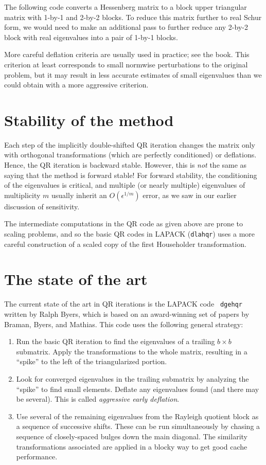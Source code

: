 \documentclass[12pt, leqno]{article} %
\begin{document}
The following code converts a Hessenberg matrix to a block upper triangular
matrix with 1-by-1 and 2-by-2 blocks.  To reduce this matrix further to
real Schur form, we would need to make an additional pass to further
reduce any 2-by-2 block with real eigenvalues into a pair of 1-by-1 blocks.



More careful deflation criteria are usually used in practice;
see the book.  This criterion at least corresponds to small normwise
perturbations to the original problem, but it may result in less
accurate estimates of small eigenvalues than we could obtain with
a more aggressive criterion.

\section{Stability of the method}

Each step of the implicitly double-shifted QR iteration changes the
matrix only with orthogonal transformations (which are perfectly conditioned)
or deflations.  Hence, the QR iteration is backward stable.  However,
this is {\em not} the same as saying that the method is forward stable!
For forward stability, the conditioning of the eigenvalues is critical,
and multiple (or nearly multiple) eigenvalues of multiplicity $m$
usually inherit an $O(\epsilon^{1/m})$ error, as we saw in our earlier
discussion of sensitivity.

The intermediate computations in the QR code as given above are prone to
scaling problems, and so the basic QR codes in LAPACK ({\tt dlahqr})
uses a more careful construction of a scaled copy of the first Householder
transformation.

\section{The state of the art}

The current state of the art in QR iterations is the LAPACK code {\tt
  dgehqr} written by Ralph Byers, which is based on an award-winning
set of papers by Braman, Byers, and Mathias.  This code uses the following
general strategy:
\begin{enumerate}
\item
  Run the basic QR iteration to find the eigenvalues of a trailing $b \times b$
  submatrix.  Apply the transformations to the whole matrix, resulting in
  a ``spike'' to the left of the triangularized portion.
\item
  Look for converged eigenvalues in the trailing submatrix by analyzing
  the ``spike'' to find small elements.  Deflate any eigenvalues found
  (and there may be several).  This is called {\em aggressive early deflation}.
\item
  Use several of the remaining eigenvalues from the Rayleigh quotient block
  as a sequence of successive shifts.  These can be run simultaneously by
  chasing a sequence of closely-spaced bulges down the main diagonal.
  The similarity transformations associated are applied in a blocky way
  to get good cache performance.
\end{enumerate}
\end{document}
